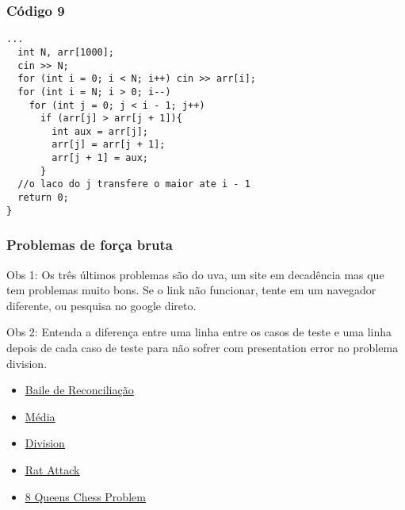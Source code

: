 \documentclass{beamer}
\begin{document}
	\begin{frame}[fragile]
	\frametitle{Código 9}
		\begin{lstlisting}
...
  int N, arr[1000];
  cin >> N;
  for (int i = 0; i < N; i++) cin >> arr[i];
  for (int i = N; i > 0; i--)
    for (int j = 0; j < i - 1; j++)
      if (arr[j] > arr[j + 1]){
        int aux = arr[j];
        arr[j] = arr[j + 1];
        arr[j + 1] = aux;
      }
  //o laco do j transfere o maior ate i - 1
  return 0;
}
		\end{lstlisting}
	\end{frame}

	\begin{frame}
	\frametitle{Problemas de força bruta}
	Obs 1: Os três últimos problemas são do uva, um site em decadência mas que tem problemas muito bons. Se o link não funcionar,
	tente em um navegador diferente, ou pesquisa no google direto. \par
	Obs 2: Entenda a diferença entre uma linha entre os casos de teste e uma linha depois de cada caso de teste
	para não sofrer com presentation error no problema division.
	\begin{itemize}
	\item \textcolor{blue}{\underline{\href{https://www.urionlinejudge.com.br/judge/pt/problems/view/1999}{Baile de Reconciliação}}}
	\item \textcolor{blue}{\underline{\href{https://www.urionlinejudge.com.br/judge/pt/problems/view/2771}{Média}}}
	\item \textcolor{blue}{\underline{\href{https://onlinejudge.org/index.php?option=com_onlinejudge&Itemid=8&category=641&page=show_problem&problem=666}{Division}}}
	\item \textcolor{blue}{\underline{\href{https://onlinejudge.org/index.php?option=onlinejudge&page=show_problem&problem=1301}{Rat Attack}}}
	\item \textcolor{blue}{\underline{\href{https://onlinejudge.org/index.php?option=onlinejudge&page=show_problem&problem=691}{8 Queens Chess Problem}}}
	\end{itemize}
	\end{frame}
\end{document}
